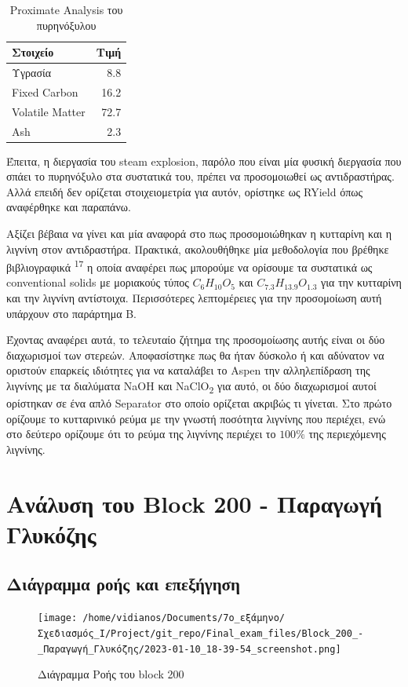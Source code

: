 \documentclass[11pt]{article}
\makeatletter
\newcommand{\citeprocitem}[2]{\hyper@linkstart{cite}{citeproc_bib_item_#1}#2\hyper@linkend}
\makeatother
\begin{document}
\begin{table}[htbp]
\caption{Proximate Analysis του πυρηνόξυλου}
\centering
\begin{tabular}{lr}
Στοιχείο & Τιμή\\
\hline
Υγρασία & 8.8\\
Fixed Carbon & 16.2\\
Volatile Matter & 72.7\\
Ash & 2.3\\
\end{tabular}
\end{table}

Έπειτα, η διεργασία του steam explosion, παρόλο που είναι μία φυσική διεργασία που σπάει το πυρηνόξυλο στα συστατικά του, πρέπει να προσομοιωθεί ως αντιδραστήρας. Αλλά επειδή δεν ορίζεται στοιχειομετρία για αυτόν, ορίστηκε ως RYield όπως αναφέρθηκε και παραπάνω.

Αξίζει βέβαια να γίνει και μία αναφορά στο πως προσομοιώθηκαν η κυτταρίνη και η λιγνίνη στον αντιδραστήρα. Πρακτικά, ακολουθήθηκε μία μεθοδολογία που βρέθηκε βιβλιογραφικά \textsuperscript{\citeprocitem{17}{17}} η οποία αναφέρει πως μπορούμε να ορίσουμε τα συστατικά ως conventional solids με μοριακούς τύπος \(C_6H_{10}O_5\) και \(C_{7.3}H_{13.9}O_{1.3}\) για την κυτταρίνη και την λιγνίνη αντίστοιχα. Περισσότερες λεπτομέρειες για την προσομοίωση αυτή υπάρχουν στο παράρτημα B.

Έχοντας αναφέρει αυτά, το τελευταίο ζήτημα της προσομοίωσης αυτής είναι οι δύο διαχωρισμοί των στερεών. Αποφασίστηκε πως θα ήταν δύσκολο ή και αδύνατον να οριστούν επαρκείς ιδιότητες για να καταλάβει το Aspen την αλληλεπίδραση της λιγνίνης με τα διαλύματα NaOH και NaClO\textsubscript{2} για αυτό, οι δύο διαχωρισμοί αυτοί ορίστηκαν σε ένα απλό Separator στο οποίο ορίζεται ακριβώς τι γίνεται. Στο πρώτο ορίζουμε το κυτταρινικό ρεύμα με την γνωστή ποσότητα λιγνίνης που περιέχει, ενώ στο δεύτερο ορίζουμε ότι το ρεύμα της λιγνίνης περιέχει το \(100 \%\) της περιεχόμενης λιγνίνης.

\section{Ανάλυση του Block 200 - Παραγωγή Γλυκόζης}
\label{sec:org303ea10}

\subsection{Διάγραμμα ροής και επεξήγηση}
\label{sec:org6df31ee}
\begin{figure}[htbp]
\centering
\texttt{[image: /home/vidianos/Documents/7o\_εξάμηνο/Σχεδιασμός\_Ι/Project/git\_repo/Final\_exam\_files/Block\_200\_-\_Παραγωγή\_Γλυκόζης/2023-01-10\_18-39-54\_screenshot.png]}
\caption{Διάγραμμα Ροής του block 200}
\end{figure}
\end{document}

